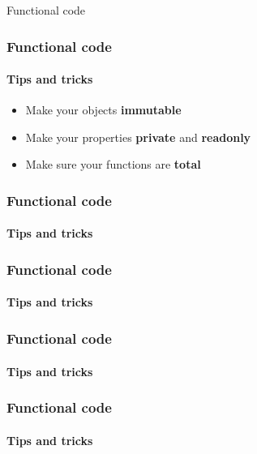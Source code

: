 \begin{sepframe}{Functional code}
    {}
\end{sepframe}

\begin{frame}
    \frametitle{Functional code}
    \framesubtitle{Tips and tricks}

    \begin{itemize}[<+->]
        \item Make your objects \textbf{immutable}
        \item Make your properties \textbf{private} and \textbf{readonly}
        \item Make sure your functions are \textbf{total}
    \end{itemize}
\end{frame}

\begin{frame}
    \frametitle{Functional code}
    \framesubtitle{Tips and tricks}


\pause

\end{frame}

\begin{frame}
    \frametitle{Functional code}
    \framesubtitle{Tips and tricks}


\pause

\end{frame}

\begin{frame}
    \frametitle{Functional code}
    \framesubtitle{Tips and tricks}


\pause

\end{frame}

\begin{frame}
    \frametitle{Functional code}
    \framesubtitle{Tips and tricks}


\pause

\end{frame}

